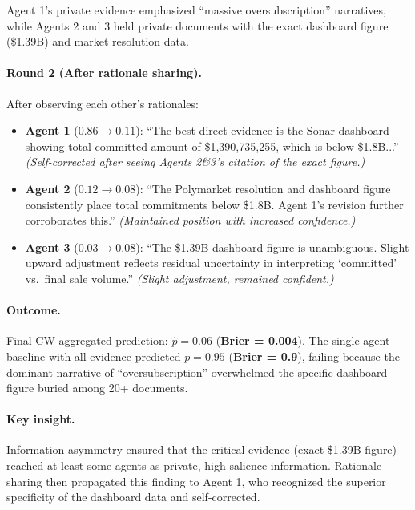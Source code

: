 \documentclass[11pt]{article}
\theoremstyle{plain}
\theoremstyle{definition}
\begin{document}
Agent 1's private evidence emphasized ``massive oversubscription'' narratives, while Agents 2 and 3 held private documents with the exact dashboard figure (\$1.39B) and market resolution data.

\paragraph{Round 2 (After rationale sharing).}
After observing each other's rationales:

\begin{itemize}[nosep,leftmargin=15pt]
\item \textbf{Agent 1} ($0.86 \to 0.11$): ``The best direct evidence is the Sonar dashboard showing total committed amount of \$1,390,735,255, which is below \$1.8B...'' \textit{(Self-corrected after seeing Agents 2\&3's citation of the exact figure.)}

\item \textbf{Agent 2} ($0.12 \to 0.08$): ``The Polymarket resolution and dashboard figure consistently place total commitments below \$1.8B. Agent
1's revision further corroborates this.'' \textit{(Maintained position with increased confidence.)}

\item \textbf{Agent 3} ($0.03 \to 0.08$): ``The \$1.39B dashboard figure is unambiguous. Slight upward adjustment reflects residual uncertainty in interpreting `committed' vs.\ final sale volume.'' \textit{(Slight adjustment, remained confident.)}
\end{itemize}

\paragraph{Outcome.} Final CW-aggregated prediction: $\hat{p} = 0.06$ (\textbf{Brier = 0.004}). The single-agent baseline with all evidence predicted $p = 0.95$ (\textbf{Brier = 0.9}), failing because the dominant narrative of ``oversubscription'' overwhelmed the specific dashboard figure buried among 20+ documents.

\paragraph{Key insight.} Information asymmetry ensured that the critical evidence (exact \$1.39B figure) reached at least some agents as private, high-salience information. Rationale sharing then propagated this finding to Agent 1, who recognized the superior specificity of the dashboard data and self-corrected.
\end{document}
